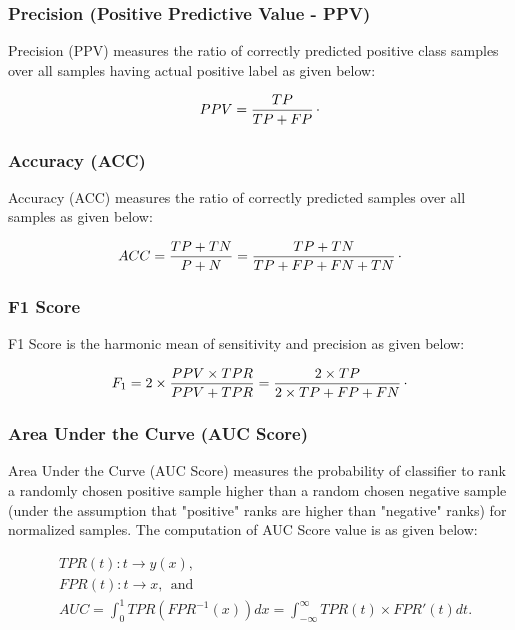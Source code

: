 \subsubsection{Precision (Positive Predictive Value - PPV)}

Precision (PPV) measures the ratio of correctly predicted positive class samples over all samples having actual positive label as given below:

\begin{equation}
	\label{eq:PPV}
	PPV = \frac{TP}{TP + FP}\raisepunct{.}
\end{equation}

\subsubsection{Accuracy (ACC)}

Accuracy (ACC) measures the ratio of correctly predicted samples over all samples as given below:

\begin{equation}
	\label{eq:ACC}
	ACC = \frac{TP + TN}{P + N} = \frac{TP + TN}{TP + FP + FN + TN}\raisepunct{.}
\end{equation}

\subsubsection{F1 Score}

F1 Score is the harmonic mean of sensitivity and precision as given below:

\begin{equation}
	\label{eq:F1_Score}
	F_{1} = 2 \times \frac{PPV \times TPR}{PPV + TPR} = \frac{2 \times TP}{2 \times TP + FP + FN}\raisepunct{.}
\end{equation}

\subsubsection{Area Under the Curve (AUC Score)}

Area Under the Curve (AUC Score) measures the probability of classifier to rank a randomly chosen positive sample higher than a random chosen negative sample (under the assumption that "positive" ranks are higher than "negative" ranks) for normalized samples. The computation of AUC Score value is as given below:

\begin{align}
	\label{eq:AUC_Score}
	\nonumber
	& TPR(t) : t \rightarrow y \left ( x \right ), \\
	\nonumber
	& FPR(t) : t \rightarrow x, \:\: \text{and} \\ 
	& AUC = \int_{0}^{1} TPR \left ( FPR^{-1}\left ( x \right ) \right ) dx = \int_{-\infty}^{\infty} TPR \left ( t \right ) \times {FPR}' \left ( t \right ) dt.
\end{align}

